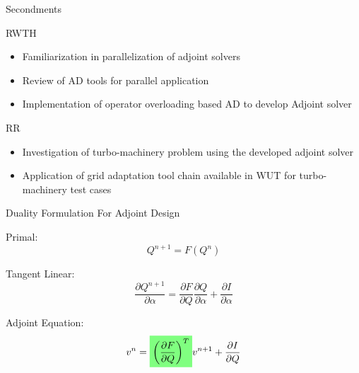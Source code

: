 \begin{frame}{Secondments}

\begin{block}{RWTH}
\begin{itemize}
\item Familiarization in parallelization of adjoint solvers
\item Review of AD tools for parallel application
\item Implementation of operator overloading based AD to develop Adjoint solver

\end{itemize}
\end{block}

\begin{block}{RR}
\begin{itemize}
\item Investigation of turbo-machinery problem using the developed adjoint solver 
\item Application of grid adaptation tool chain available in WUT for turbo-machinery test cases
\end{itemize}
\end{block}
\end{frame}

\begin{frame}{Duality Formulation For Adjoint Design}
\begin{block}{Primal:}
\begin{equation}
Q^{n+1}=F(Q^n)
\end{equation}
\end{block}
\begin{block}{Tangent Linear:}
\begin{equation}
\frac{\partial Q^{n+1}}{\partial \alpha} = \frac{\partial F}{\partial Q}\frac{\partial Q}{\partial \alpha} +\frac{\partial I}{\partial \alpha}
\end{equation}
\end{block}

\begin{block}{Adjoint Equation:}
\begin{equation}
v^n = \highlight{\left(\frac{\partial F}{\partial Q}\right)^{T}}v^{n+1} +\frac{\partial I}{\partial Q}
\end{equation}
\end{block}


\end{frame}

